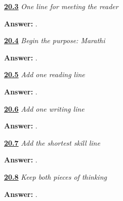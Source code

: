 \noindent\begin{minipage}[t]{\linewidth}
\raggedright
\hyperlink{review-MR-A1M03-meeting-line-check}{\textbf{20.3}} \emph{One line for meeting the reader}\par
\small \textbf{Answer:}   .\par
\end{minipage}\par\medskip

\noindent\begin{minipage}[t]{\linewidth}
\raggedright
\hyperlink{review-MR-A1M04-language-line-check}{\textbf{20.4}} \emph{Begin the purpose: Marathi}\par
\small \textbf{Answer:}   .\par
\end{minipage}\par\medskip

\noindent\begin{minipage}[t]{\linewidth}
\raggedright
\hyperlink{review-MR-A1M05-reading-line-check}{\textbf{20.5}} \emph{Add one reading line}\par
\small \textbf{Answer:}   .\par
\end{minipage}\par\medskip

\noindent\begin{minipage}[t]{\linewidth}
\raggedright
\hyperlink{review-MR-A1M06-writing-line-check}{\textbf{20.6}} \emph{Add one writing line}\par
\small \textbf{Answer:}    .\par
\end{minipage}\par\medskip

\noindent\begin{minipage}[t]{\linewidth}
\raggedright
\hyperlink{review-MR-A1M07-speaking-line-check}{\textbf{20.7}} \emph{Add the shortest skill line}\par
\small \textbf{Answer:}  .\par
\end{minipage}\par\medskip

\noindent\begin{minipage}[t]{\linewidth}
\raggedright
\hyperlink{review-MR-A1M08-thinking-line-check}{\textbf{20.8}} \emph{Keep both pieces of thinking}\par
\small \textbf{Answer:}   .\par
\end{minipage}\par\medskip


